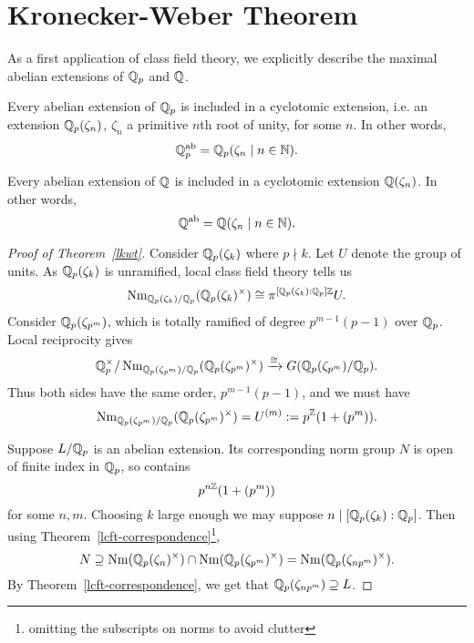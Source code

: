 \section{Kronecker-Weber Theorem}
As a first application of class field theory, we explicitly describe the maximal abelian extensions of $\mathbb{Q}_p$ and $\mathbb{Q}$.
\begin{thm}
Every abelian extension of $\mathbb{Q}_p$ is included in  a cyclotomic extension, i.e. an extension $\mathbb{Q}_p(\zeta_n)$, $\zeta_n$ a primitive $n$th root of unity, for some $n$. In other words,
\[
\mathbb{Q}_p^{\text{ab}}=\mathbb{Q}_p(\zeta_n\mid n\in \mathbb{N}).
\]
\end{thm}
\begin{thm}
Every abelian extension of $\mathbb{Q}$ is included in  a cyclotomic extension $\mathbb{Q}(\zeta_n)$. In other words,
\[
\mathbb{Q}^{\text{ab}}=\mathbb{Q}(\zeta_n\mid n\in \mathbb{N}).
\]
\end{thm}
\begin{proof}[Proof of Theorem~\ref{lkwt}]
Consider $\mathbb{Q}_p(\zeta_k)$ where $p\nmid k$. Let $U$ denote the group of units. As $\mathbb{Q}_p(\zeta_k)$ is unramified, local class field theory tells us %
\[
\operatorname{Nm}_{\mathbb{Q}_p(\zeta_k)/\mathbb{Q}_p} (\mathbb{Q}_p(\zeta_k)^{\times})\cong \pi^{[\mathbb{Q}_p(\zeta_k):\mathbb{Q}_p]\mathbb{Z}}U.
\]
Consider $\mathbb{Q}_p(\zeta_{p^m})$, which is totally ramified of degree $p^{m-1}(p-1)$ over $\mathbb{Q}_p$. Local reciprocity gives
\[
\mathbb{Q}_p^{\times}/\operatorname{Nm}_{\mathbb{Q}_p(\zeta_{p^m})/\mathbb{Q}_p} (\mathbb{Q}_p(\zeta_{p^m})^{\times})\xrightarrow{\cong} G(\mathbb{Q}_p(\zeta_{p^m})/\mathbb{Q}_p).
\]
Thus both sides have the same order, $p^{m-1}(p-1)$, and we must have
\[
\operatorname{Nm}_{\mathbb{Q}_p(\zeta_{p^m})/\mathbb{Q}_p}(\mathbb{Q}_p(\zeta_{p^m})^{\times})=U^{(m)}:=p^{\mathbb{Z}}(1+(p^m)).
\]

Suppose $L/\mathbb{Q}_p$ is an abelian extension. 
Its corresponding norm group $N$ is open of finite index in $\mathbb{Q}_p$, so contains  
\[p^{n\mathbb{Z}}(1+(p^m))\]
for some $n,m$. 
Choosing $k$ large enough we may suppose $ n\mid [\mathbb{Q}_p(\zeta_k):\mathbb{Q}_p]$.  
Then using Theorem~\ref{lcft-correspondence}\footnote{omitting the subscripts on norms to avoid clutter},
\[N\supeq\nm%
(\Q_p(\ze_n)^{\times})\cap \nm%
(\Q_p(\ze_{p^m})^{\times})=
\nm%
(\Q_p(\ze_{np^m})^{\times}).\]
By Theorem~\ref{lcft-correspondence}, we get that $\mathbb{Q}_p(\zeta_{np^m})\supseteq L$.
\end{proof}
